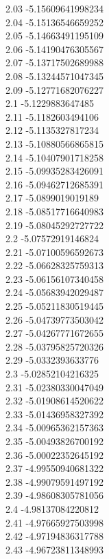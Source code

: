 {2.03	-5.15609641998234\\
2.04	-5.15136546659252\\
2.05	-5.14663491195109\\
2.06	-5.14190476305567\\
2.07	-5.13717502689988\\
2.08	-5.13244571047345\\
2.09	-5.12771682076227\\
2.1	-5.1229883647485\\
2.11	-5.1182603494106\\
2.12	-5.1135327817234\\
2.13	-5.10880566865815\\
2.14	-5.10407901718258\\
2.15	-5.09935283426091\\
2.16	-5.09462712685391\\
2.17	-5.0899019019189\\
2.18	-5.08517716640983\\
2.19	-5.08045292727722\\
2.2	-5.07572919146824\\
2.21	-5.07100596592673\\
2.22	-5.06628325759313\\
2.23	-5.06156107340458\\
2.24	-5.05683942029487\\
2.25	-5.05211830519445\\
2.26	-5.04739773503042\\
2.27	-5.04267771672655\\
2.28	-5.03795825720326\\
2.29	-5.0332393633776\\
2.3	-5.02852104216325\\
2.31	-5.02380330047049\\
2.32	-5.01908614520622\\
2.33	-5.01436958327392\\
2.34	-5.00965362157363\\
2.35	-5.00493826700192\\
2.36	-5.00022352645192\\
2.37	-4.99550940681322\\
2.38	-4.99079591497192\\
2.39	-4.98608305781056\\
2.4	-4.98137084220812\\
2.41	-4.97665927503998\\
2.42	-4.97194836317788\\
2.43	-4.96723811348993\\
}
